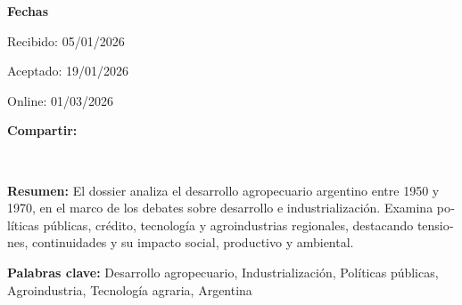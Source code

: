 \documentclass{article}
\begin{document}
\begin{textblock*}{68mm}
{\begin{minipage}[t]{68mm}
{\bfseries\color{azulrevista!70}Fechas}\par\vspace{2pt}
Recibido: 05/01/2026\par
Aceptado: 19/01/2026\par
Online: 01/03/2026\par
\vspace{6pt}
\vspace{6pt}
{\bfseries\color{azulrevista!70}Compartir:}\par\vspace{3pt}
{\large
\href{https://bsky.app/intent/compose?text=url-html}{}~
\href{mailto:?subject=El%20desarrollo%20agropecuario%20argentino%20en%20la%20segunda%20posguerra&body=url-html}{}~
\href{https://www.facebook.com/sharer/sharer.php?u=url-html}{}~
\href{https://www.linkedin.com/sharing/share-offsite/?url=url-html}{}~
\href{https://www.reddit.com/submit?url=url-html&title=El%20desarrollo%20agropecuario%20argentino%20en%20la%20segunda%20posguerra}{}~
\href{https://www.researchgate.net/search?q=El%20desarrollo%20agropecuario%20argentino%20en%20la%20segunda%20posguerra}{}~
\href{https://t.me/share/url?url=url-html&text=El%20desarrollo%20agropecuario%20argentino%20en%20la%20segunda%20posguerra}{}~
\href{https://wa.me/?text=url-html}{}~
\href{https://twitter.com/intent/tweet?url=url-html&text=El%20desarrollo%20agropecuario%20argentino%20en%20la%20segunda%20posguerra}{}
}\par
\end{minipage}%
}%
\end{textblock*}


\begin{tcolorbox}[colback=brown!8!white,colframe=brown!8!white,boxrule=0pt,arc=2pt,left=4pt,right=4pt,top=3pt,bottom=3pt,before skip=4pt,after skip=4pt]
\begin{otherlanguage}{spanish}
\sffamily\small \textbf{Resumen:} El dossier analiza el desarrollo agropecuario argentino entre 1950 y 1970, en el marco de los debates sobre desarrollo e industrialización. Examina políticas públicas, crédito, tecnología y agroindustrias regionales, destacando tensiones, continuidades y su impacto social, productivo y ambiental.
\par\smallskip\noindent\textbf{Palabras clave:} Desarrollo agropecuario, Industrialización, Políticas públicas, Agroindustria, Tecnología agraria, Argentina
\end{otherlanguage}
\end{tcolorbox}
\end{document}
